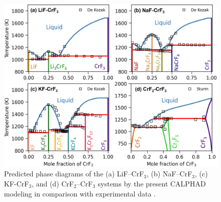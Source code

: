 \begin{figure}[H]
    \centering
    \includegraphics[width=1\linewidth]{moltensalts/Moltensalts-FLiNaKCr-Phasediagram.jpg}
    \caption{Predicted phase diagrams of the (a) LiF–CrF$_3$, (b) NaF–CrF$_3$, (c) KF-CrF$_3$, and (d) CrF$_2$–CrF$_3$ systems by the present CALPHAD modeling in comparison with experimental data \cite{de1975systeme, DeKozak1969, sturm1962phase}.}
    \label{ms:fig:FLiNaKCr-Phasediagram}
\end{figure}
\newpage
\begingroup
\renewcommand\arraystretch{0.8}
